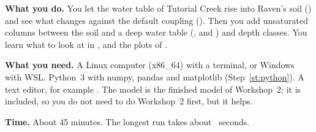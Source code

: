 \begin{goal}
\textbf{What you do.} You let the water table of Tutorial Creek rise into Raven's soil () and see
what changes against the default coupling (). Then you add unsaturated columns between the soil and a deep
water table (,  and ) and depth classes. You learn what to look at in
,  and the plots of .

\textbf{What you need.} A Linux computer (x86\_64) with a terminal, or Windows with WSL. Python~3 with numpy, pandas and
matplotlib (Step~\ref{st:python}). A text editor, for example . The model is the finished model of Workshop~2;
it is included, so you do not need to do Workshop~2 first, but it helps.

\textbf{Time.} About 45 minutes. The longest run takes about ~seconds.
\end{goal}
